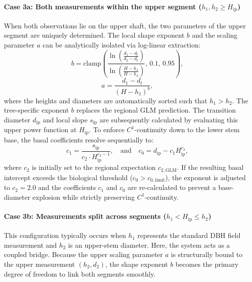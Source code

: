 \documentclass[twocolumn, bibliography=totoc]{scrartcl}
\begin{document}
\paragraph{Case 3a: Both measurements within the upper segment ($h_1, h_2 \ge H_{\text{ip}}$)}
When both observations lie on the upper shaft, the two parameters of the upper segment are uniquely determined. The local shape exponent $b$ and the scaling parameter $a$ can be analytically isolated via log-linear extraction:
\begin{equation}
    b = \text{clamp}\left( \frac{\ln\left( \frac{d_1 - d_t}{d_2 - d_t} \right)}{\ln\left( \frac{H - h_1}{H - h_2} \right)}, \, 0.1, \, 0.95 \right),
\end{equation}
\begin{equation}
    a = \frac{d_1 - d_t}{(H - h_1)^b},
\end{equation}
where the heights and diameters are automatically sorted such that $h_1 > h_2$. The tree-specific exponent $b$ replaces the regional $\text{GLM}$ prediction. The transition diameter $d_{\text{ip}}$ and local slope $s_{\text{ip}}$ are subsequently calculated by evaluating this upper power function at $H_{\text{ip}}$. To enforce $C^1$-continuity down to the lower stem base, the basal coefficients resolve sequentially to:
\begin{equation}
    c_1 = \frac{s_{\text{ip}}}{c_2 \cdot H_{\text{ip}}^{c_2-1}}, 
    \quad \text{and} \quad c_0 = d_{\text{ip}} - c_1 H_{\text{ip}}^{c_2},
\end{equation}
where $c_2$ is initially set to the regional expectation $c_{2,\text{GLM}}$. If the resulting basal intercept exceeds the biological threshold ($c_0 > c_{0,\text{limit}}$), the exponent is adjusted to $c_2 = 2.0$ and the coefficients $c_1$ and $c_0$ are re-calculated to prevent a base-diameter explosion while strictly preserving $C^1$-continuity.

\paragraph{Case 3b: Measurements split across segments ($h_1 < H_{\text{ip}} \le h_2$)}
This configuration typically occurs when $h_1$ represents the standard $\text{DBH}$ field measurement and $h_2$ is an upper-stem diameter. Here, the system acts as a coupled bridge. Because the upper scaling parameter $a$ is structurally bound to the upper measurement $(h_2, d_2)$, the shape exponent $b$ becomes the primary degree of freedom to link both segments smoothly.
\end{document}
